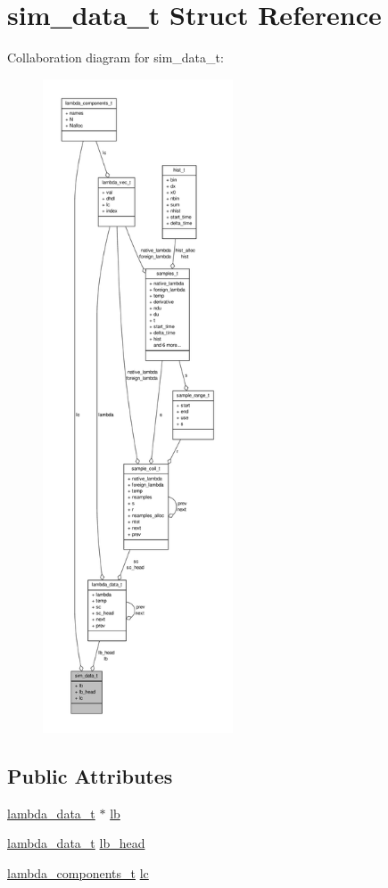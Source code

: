 \hypertarget{structsim__data__t}{\section{sim\-\_\-data\-\_\-t \-Struct \-Reference}
\label{structsim__data__t}
}


\-Collaboration diagram for sim\-\_\-data\-\_\-t\-:
\nopagebreak
\begin{figure}[H]
\begin{center}
\leavevmode
\includegraphics[height=550pt]{structsim__data__t__coll__graph}
\end{center}
\end{figure}
\subsection*{\-Public \-Attributes}
\begin{DoxyCompactItemize}
\item 
\hyperlink{structlambda__data__t}{lambda\-\_\-data\-\_\-t} $\ast$ \hyperlink{structsim__data__t_a63698543a416c5d8e46403e29d1fae3c}{lb}
\item 
\hyperlink{structlambda__data__t}{lambda\-\_\-data\-\_\-t} \hyperlink{structsim__data__t_a1a562fff01d45850679b15cdb16d0ac5}{lb\-\_\-head}
\item 
\hyperlink{structlambda__components__t}{lambda\-\_\-components\-\_\-t} \hyperlink{structsim__data__t_a87d0fa30f1aa672a625fdf35a7584eac}{lc}
\end{DoxyCompactItemize}


